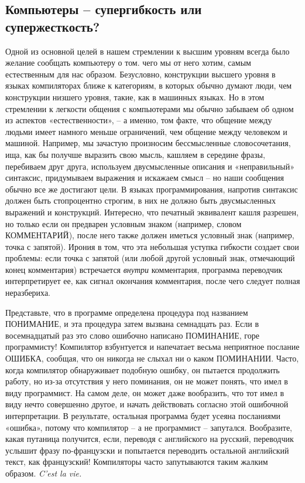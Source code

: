 \documentclass[../main.tex]{subfiles}
\begin{document}
\subsection{Компьютеры \--- супергибкость или супержесткость?}

Одной из основной целей в нашем стремлении к высшим уровням всегда было желание сообщать компьютеру о том. чего мы от него хотим, самым естественным для нас образом. Безусловно, конструкции высшего уровня в языках компиляторах ближе к категориям, в которых обычно думают люди, чем конструкции низшего уровня, такие, как в машинных языках. Но в этом стремлении к легкости общения с компьютерами мы обычно забываем об одном из аспектов «естественности», \--- а именно, том факте, что общение между людьми имеет намного меньше ограничений, чем общение между человеком и машиной. Например, мы зачастую произносим бессмысленные словосочетания, ища, как бы получше выразить свою мысль, кашляем в середине фразы, перебиваем друг друга, используем двусмысленные описания и «неправильный» синтаксис, придумываем выражения и искажаем смысл \--- но наши сообщения обычно все же достигают цели. В языках программирования, напротив синтаксис должен быть стопроцентно строгим, в них не должно быть двусмысленных выражений и конструкций. Интересно, что печатный эквивалент кашля разрешен, но только если он предварен условным знаком (например, словом КОММЕНТАРИЙ), после него также должен иметься условный знак (например, точка с запятой). Ирония в том, что эта небольшая уступка гибкости создает свои проблемы: если точка с запятой (или любой другой условный знак, отмечающий конец комментария) встречается \emph{внутри} комментария, программа переводчик интерпретирует ее, как сигнал окончания комментария, после чего следует полная неразбериха.

Представьте, что в программе определена процедура под названием ПОНИМАНИЕ, и эта процедура затем вызвана семнадцать раз. Если в восемнадцатый раз это слово ошибочно написано ПОМИНАНИЕ, горе программисту! Компилятор взбунтуется и напечатает весьма неприятное послание ОШИБКА, сообщая, что он никогда не слыхал ни о каком ПОМИНАНИИ. Часто, когда компилятор обнаруживает подобную ошибку, он пытается продолжить работу, но из-за отсутствия у него поминания, он не может понять, что имел в виду программист. На самом деле, он может даже вообразить, что тот имел в виду нечто совершенно другое, и начать действовать согласно этой ошибочной интерпретации. В результате, остальная программа будет усеяна посланиями «ошибка», потому что компилятор \--- а не программист \--- запутался. Вообразите, какая путаница получится, если, переводя с английского на русский, переводчик услышит фразу по-французски и попытается переводить остальной английский текст, как французский! Компиляторы часто запутываются таким жалким образом. \emph{C'est la vie.}
\end{document}
